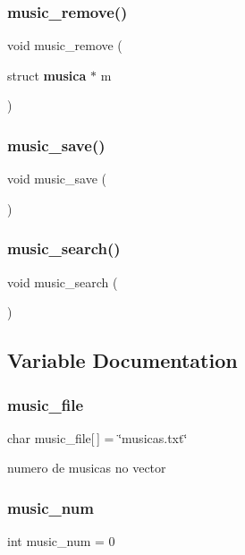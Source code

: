 \mbox{\label{menu__music_8c_a3ed1d066f06b3b8ce2416cf4418231f9}} 
\subsubsection{music\_remove()}
{\footnotesize\ttfamily void music\+\_\+remove (\begin{DoxyParamCaption}\item[{struct \textbf{ musica} $\ast$}]{m }\end{DoxyParamCaption})}

\mbox{\label{menu__music_8c_aca4dc8bca342d560906d9c5a375e5b52}} 
\subsubsection{music\_save()}
{\footnotesize\ttfamily void music\+\_\+save (\begin{DoxyParamCaption}{ }\end{DoxyParamCaption})}

\mbox{\label{menu__music_8c_acd2ed77d07ab0a38a48ff3e12e405a37}} 
\subsubsection{music\_search()}
{\footnotesize\ttfamily void music\+\_\+search (\begin{DoxyParamCaption}{ }\end{DoxyParamCaption})}



\subsection{Variable Documentation}
\mbox{\label{menu__music_8c_a60b482a81a97025e2040341d609a3d88}} 
\subsubsection{music\_file}
{\footnotesize\ttfamily char music\+\_\+file[$\,$] = \char`\"{}musicas.\+txt\char`\"{}}



numero de musicas no vector 

\mbox{\label{menu__music_8c_a2fc88755839757d7176cb71c37064b39}} 
\subsubsection{music\_num}
{\footnotesize\ttfamily int music\+\_\+num = 0}

